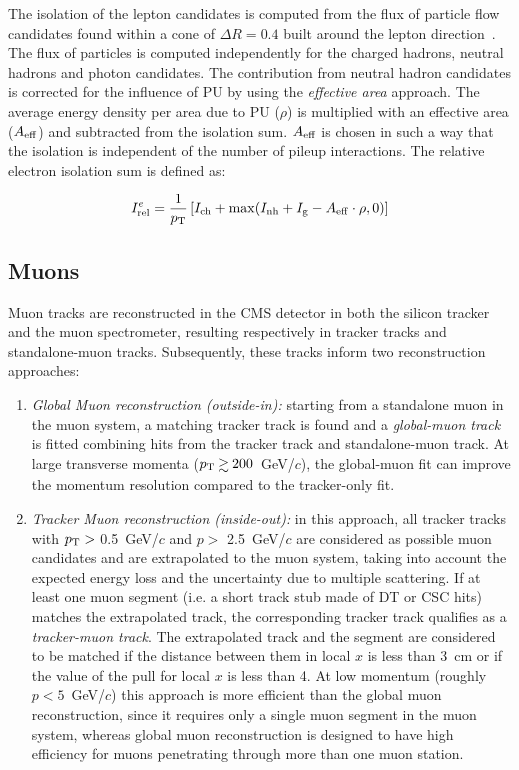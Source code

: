 The isolation of the lepton candidates is computed from the flux of particle flow candidates
found within a cone of $\Delta R = 0.4$ built around the lepton direction~\cite{CMS-PAS-PFT-10-002}.
The flux of particles is computed independently for the charged hadrons, neutral hadrons and photon candidates.
The contribution from neutral hadron candidates is corrected for the influence of PU by using the \textit{effective area} approach.  The average energy density per area due to PU ($\rho$) is multiplied with an effective area ($A_{\rm eff}$) and subtracted from the isolation sum. $A_{\rm eff}$ is chosen in such a way that the isolation is independent of the number of pileup interactions.
The relative electron isolation sum is defined as: 

\begin{equation}
I^{e}_{\rm rel}=\frac{1}{p_{\rm T}}  \left[ I_{\rm ch}+\max(I_{\rm nh}+I_{\rm g}-A_{\rm eff}\cdot\rho,0) \right]
\label{eq:eleisol}
\end{equation}

\subsection{Muons}
Muon tracks are reconstructed in the CMS detector in both the silicon tracker and the muon spectrometer,
resulting respectively in tracker tracks and standalone-muon tracks.
Subsequently, these tracks inform two reconstruction approaches:
\begin{enumerate}
  \item {\em Global Muon reconstruction (outside-in):} starting from a standalone
    muon in the muon system, a matching tracker track is found and a
    {\em global-muon track} is fitted combining hits from the tracker track
    and standalone-muon track. At large transverse momenta ($\pt \gsim 200$~GeV/$c$),
    the global-muon fit can improve the momentum resolution compared
    to the tracker-only fit. 
  \item {\em Tracker Muon reconstruction (inside-out):} in this approach, all
    tracker tracks with $p_\mathrm{T} >$ 0.5~GeV/$c$ and $p >$ 2.5~GeV/$c$ are
    considered as possible muon candidates and are extrapolated to the muon system, taking into
    account the expected energy loss and the uncertainty due to multiple
    scattering. If at least one muon segment (i.e. a short track stub made of DT or CSC hits)
    matches the extrapolated track,
    the corresponding tracker track qualifies as a {\em tracker-muon track}.
    The extrapolated track and the segment are considered to be matched if the distance
    between them in local $x$ is less than 3~cm or if the value of the pull
    for local $x$ is less than 4.
    At low momentum (roughly $p < 5$~GeV/$c$) this approach is more
    efficient than the global muon 
    reconstruction, since it requires only a single muon segment in
    the muon system, whereas global muon reconstruction is designed to have
    high efficiency for muons penetrating through more than one muon station.
\end{enumerate}

